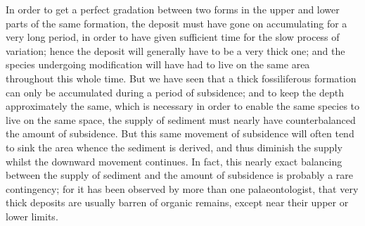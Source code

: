 In order to get a perfect gradation between two forms in the upper and lower parts of the same formation, the deposit must have gone on accumulating for a very long period, in order to have given sufficient time for the slow process of variation; hence the deposit will generally have to be a very thick one; and the species undergoing modification will have had to live on the same area throughout this whole time. But we have seen that a thick fossiliferous formation can only be accumulated during a period of subsidence; and to keep the depth approximately the same, which is necessary in order to enable the same species to live on the same space, the supply of sediment must nearly have counterbalanced the amount of subsidence. But this same movement of subsidence will often tend to sink the area whence the sediment is derived, and thus diminish the supply whilst the downward movement continues. In fact, this nearly exact balancing between the supply of sediment and the amount of subsidence is probably a rare contingency; for it has been observed by more than one palaeontologist, that very thick deposits are usually barren of organic remains, except near their upper or lower limits.
